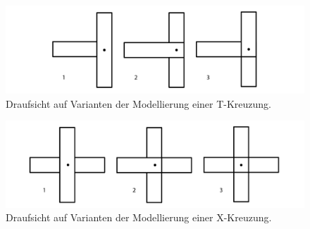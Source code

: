 \begin{figure}[ht]
    \centering
    \includegraphics[width=0.8\columnwidth]{fig/t_joint_variationen.png}
    \caption{Draufsicht auf Varianten der Modellierung einer T-Kreuzung.}
    \label{fig:concept:t_joint_variationen}
\end{figure}

\begin{figure}[hb]
    \centering
    \includegraphics[width=0.8\columnwidth]{fig/x_joint_variationen.png}
    \caption{Draufsicht auf Varianten der Modellierung einer X-Kreuzung.}
    \label{fig:concept:x_joint_variationen}
\end{figure}

